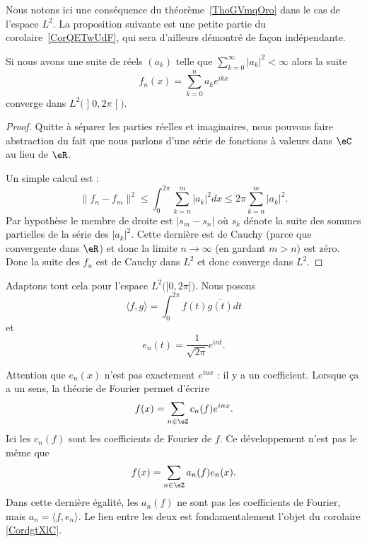 Nous notons ici une conséquence du théorème~\ref{ThoGVmqOro} dans le cas de l'espace \( L^2\). La proposition suivante est une petite partie du corolaire~\ref{CorQETwUdF}, qui sera d'ailleurs démontré de façon indépendante.

\begin{proposition}
    Si nous avons une suite de réels \( (a_k)\) telle que \( \sum_{k=0}^{\infty}| a_k |^2<\infty\) alors la suite
    \begin{equation}
        f_n(x)=\sum_{k=0}^na_k e^{ikx}
    \end{equation}
    converge dans \( L^2\big( \mathopen] 0 , 2\pi \mathclose[ \big)\).
\end{proposition}

\begin{proof}
    Quitte à séparer les parties réelles et imaginaires, nous pouvons faire abstraction du fait que nous parlons d'une série de fonctions à valeurs dans \( \eC\) au lieu de \( \eR\).

    Un simple calcul est :
    \begin{equation}    \label{EqHVdJxZT}
        \| f_n-f_m \|^2\leq\int_0^{2\pi}\sum_{k=n}^m| a_k |^2dx\leq 2\pi\sum_{k=n}^m| a_k |^2.
    \end{equation}
    Par hypothèse le membre de droite est \( | s_m-s_n |\) où \( s_k\) dénote la suite des sommes partielles de la série des \( | a_k |^2\). Cette dernière est de Cauchy (parce que convergente dans \( \eR\)) et donc la limite \( n\to\infty\) (en gardant \( m>n\)) est zéro. Donc la suite des \( f_n\) est de Cauchy dans \( L^2\) et donc converge dans \( L^2\).
\end{proof}

\begin{normaltext}
    Adaptons tout cela pour l'espace \( L^2\big( \mathopen[ 0 , 2\pi \mathclose] \big)\). Nous posons
    \begin{equation}        \label{EQooBFKDooMkCZOt}
        \langle f, g\rangle =\int_0^{2\pi}f(t)\overline{ g(t) }dt
    \end{equation}
    et
    \begin{equation}        \label{EQooKMYOooLZCNap}
        e_n(t)=\frac{1}{ \sqrt{ 2\pi } } e^{int}.
    \end{equation}
\end{normaltext}

\begin{normaltext}
    Attention que \( e_n(x)\) n'est pas exactement \(  e^{inx}\) : il y a un coefficient. Lorsque ça a un sens, la théorie de Fourier permet d'écrire
    \begin{equation}
        f(x)=\sum_{n\in \eZ}c_n(f) e^{inx}.
    \end{equation}
    Ici les \( c_n(f)\) sont les coefficients de Fourier de \( f\). Ce développement n'est pas le même que
    \begin{equation}
        f(x)=\sum_{n\in \eZ}a_n(f)e_n(x).
    \end{equation}
    Dans cette dernière égalité, les \( a_n(f)\) ne sont pas les coefficients de Fourier, mais \( a_n=\langle f, e_n\rangle \). Le lien entre les deux est fondamentalement l'objet du corolaire \ref{CordgtXlC}.
\end{normaltext}


